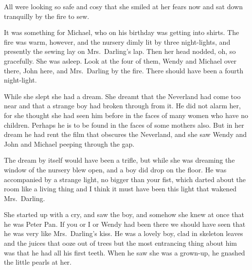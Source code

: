 All were looking so safe and cosy that she smiled at her fears now and sat down
tranquilly by the fire to sew.

It was something for Michael, who on his birthday was getting into shirts. The
fire was warm, however, and the nursery dimly lit by three night-lights, and
presently the sewing lay on Mrs.\ Darling's lap. Then her head nodded, oh, so
gracefully. She was asleep. Look at the four of them, Wendy and Michael over
there, John here, and Mrs.\ Darling by the fire. There should have been a fourth
night-light.

While she slept she had a dream. She dreamt that the Neverland had come too near
and that a strange boy had broken through from it. He did not alarm her, for she
thought she had seen him before in the faces of many women who have no children.
Perhaps he is to be found in the faces of some mothers also. But in her dream he
had rent the film that obscures the Neverland, and she saw Wendy and John and
Michael peeping through the gap.

The dream by itself would have been a trifle, but while she was dreaming the
window of the nursery blew open, and a boy did drop on the floor. He was
accompanied by a strange light, no bigger than your fist, which darted about the
room like a living thing and I think it must have been this light that wakened
Mrs.\ Darling.

She started up with a cry, and saw the boy, and somehow she knew at once that he
was Peter Pan. If you or I or Wendy had been there we should have seen that he
was very like Mrs.\ Darling's kiss. He was a lovely boy, clad in skeleton leaves
and the juices that ooze out of trees but the most entrancing thing about him
was that he had all his first teeth. When he saw she was a grown-up, he gnashed
the little pearls at her.
